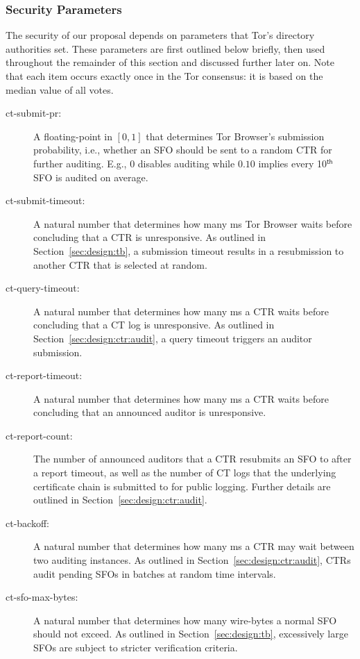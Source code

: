 \subsubsection{Security Parameters}
The security of our proposal depends on parameters that Tor's directory
authorities set.  These parameters are first outlined below briefly, then used
throughout the remainder of this section and discussed further later on.
Note that each item occurs exactly once in the Tor consensus:
it is based on the median value of all votes.
\begin{description}
	\item[ct-submit-pr:] A floating-point in $[0,1]$ that determines Tor
		Browser's submission probability, i.e., whether an SFO should be sent to
		a random CTR for further auditing.  E.g., $0$ disables auditing
		while $0.10$ implies every 10$^{\mathsf{th}}$ SFO is audited
		on average.
	\item[ct-submit-timeout:] A natural number that determines how many ms Tor
		Browser waits before concluding that a CTR is unresponsive.  As
		outlined in Section~\ref{sec:design:tb}, a submission timeout results
		in a resubmission to another CTR that is selected at random.
	\item[ct-query-timeout:] A natural number that determines how many ms a CTR
		waits before concluding that a CT log is unresponsive.  As outlined in
		Section~\ref{sec:design:ctr:audit}, a query timeout triggers an
		auditor submission.
	\item[ct-report-timeout:] A natural number that determines how many ms a
		CTR waits before concluding that an announced auditor is unresponsive.
	\item[ct-report-count:] The number of announced auditors that a CTR
		resubmits an SFO to after a report timeout, as well as the number of CT
		logs that the underlying certificate chain is submitted to for public
		logging.  Further details are outlined in
		Section~\ref{sec:design:ctr:audit}.
	\item[ct-backoff:] A natural number that determines how many ms a CTR
		may wait between two auditing instances.  As outlined in
		Section~\ref{sec:design:ctr:audit}, CTRs audit pending SFOs
		in batches at random time intervals.
	\item[ct-sfo-max-bytes:] A natural number that determines how many
		wire-bytes a normal SFO should not exceed.  As outlined in
		Section~\ref{sec:design:tb}, excessively large SFOs are subject to
		stricter verification criteria.
\end{description}

